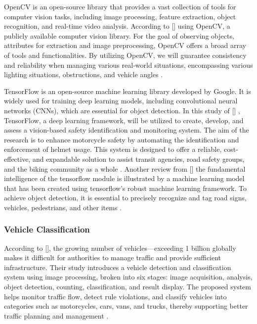 \begin{refsection}
OpenCV is an open-source library that provides a vast collection of tools for computer vision tasks, including image processing, feature extraction, object recognition, and real-time video analysis. According to \citeauthor{satheesh2024automated} [\citeyear{satheesh2024automated}] using OpenCV, a publicly available computer vision library. For the goal of observing objects, attributes for extraction and image preprocessing, OpenCV offers a broad array of tools and functionalities. By utilizing OpenCV, we will guarantee consistency and reliability when managing various real-world situations, encompassing various lighting situations, obstructions, and vehicle angles \cite{satheesh2024automated}.


TensorFlow is an open-source machine learning library developed by Google. It is widely used for training deep learning models, including convolutional neural networks (CNNs), which are essential for object detection. In this study of \citeauthor{kumar2023vision} [\citeyear{kumar2023vision}] , TensorFlow, a deep learning framework, will be utilized to create, develop, and assess a vision-based safety identification and monitoring system. The aim of the research is to enhance motorcycle safety by automating the identification and enforcement of helmet usage. This system is designed to offer a reliable, cost-effective, and expandable solution to assist transit agencies, road safety groups, and the biking community as a whole \cite{kumar2023vision}. Another review from \citeauthor{sharma2024vision} [\citeyear{sharma2024vision}] the fundamental intelligence of the tensorflow module is illustrated by a machine learning model that has been created using tensorflow's robust machine learning framework. To achieve object detection, it is essential to precisely recognize and tag road signs, vehicles, pedestrians, and other items \cite{sharma2024vision}.  


\subsubsection{Vehicle Classification}
    According to \citeauthor{chandrika2020vehicle} [\citeyear{chandrika2020vehicle}], the growing number of vehicles—exceeding 1 billion globally makes it difficult for authorities to manage traffic and provide sufficient infrastructure. Their study introduces a vehicle detection and classification system using image processing, broken into six stages: image acquisition, analysis, object detection, counting, classification, and result display. The proposed system helps monitor traffic flow, detect rule violations, and classify vehicles into categories such as motorcycles, cars, vans, and trucks, thereby supporting better traffic planning and management \cite{chandrika2020vehicle}.



\end{refsection}
